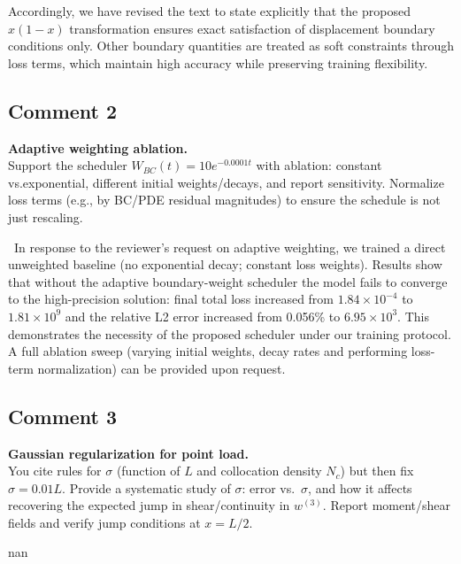\documentclass{ar2rc}
\begin{document}
  Accordingly, we have revised the text to state explicitly that the proposed $x(1-x)$ transformation ensures exact satisfaction of displacement boundary conditions only. Other boundary quantities are treated as soft constraints through loss terms, which maintain high accuracy while preserving training flexibility.



	\subsection{Comment 2}
	
	\RC\textbf{Adaptive weighting ablation.}\\
    Support the scheduler $W_{BC}(t)=10e^{-0.0001t}$ with ablation: constant vs.exponential, different initial weights/decays, and report sensitivity. Normalize loss terms (e.g., by BC/PDE residual magnitudes) to ensure the schedule is not just rescaling.
	
  \AR\ In response to the reviewer's request on adaptive weighting, we trained a direct unweighted baseline (no exponential decay; constant loss weights). Results show that without the adaptive boundary-weight scheduler the model fails to converge to the high-precision solution: final total loss increased from $1.84 \times 10^{-4}$ to $1.81 \times 10^{9}$ and the relative L2 error increased from 0.056\% to $6.95 \times 10^{3}$. This demonstrates the necessity of the proposed scheduler under our training protocol. A full ablation sweep (varying initial weights, decay rates and performing loss-term normalization) can be provided upon request.



	\subsection{Comment 3}
	
	\RC\textbf{Gaussian regularization for point load.}\\
    You cite rules for $\sigma$ (function of $L$ and collocation density $N_c$) but then fix $\sigma=0.01L$. Provide a systematic study of $\sigma$: error vs.\ $\sigma$, and how it affects recovering the expected jump in shear/continuity in $w^{(3)}$. Report moment/shear fields and verify jump conditions at $x=L/2$.
	
  \AR nan 
\end{document}
